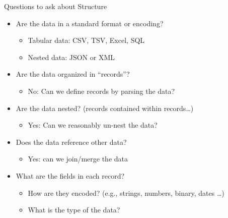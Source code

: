 \documentclass[aspectratio=169]{../latex_main/tntbeamer}  %
\begin{document}
	
	\begin{frame}{Questions to ask about Structure}
	    \begin{itemize}
	        \item Are the data in a standard format or encoding?
	        \begin{itemize}
	            \item Tabular data: CSV, TSV, Excel, SQL
	            \item Nested data: JSON or XML
	       \end{itemize}
	       \item Are the data organized in “records”?
           \begin{itemize}
               \item No: Can we define records by parsing the data?
           \end{itemize}
           \item Are the data nested? (records contained within records…)
           \begin{itemize}
               \item Yes: Can we reasonably un-nest the data?
           \end{itemize}
           \item Does the data reference other data?
           \begin{itemize}
               \item Yes: can we join/merge the data
           \end{itemize}
           \item What are the fields in each record?
           \begin{itemize}
               \item How are they encoded?  (e.g., strings, numbers, binary, dates …)
               \item What is the type of the data?
           \end{itemize}
	    \end{itemize}
	\end{frame}
\end{document}
